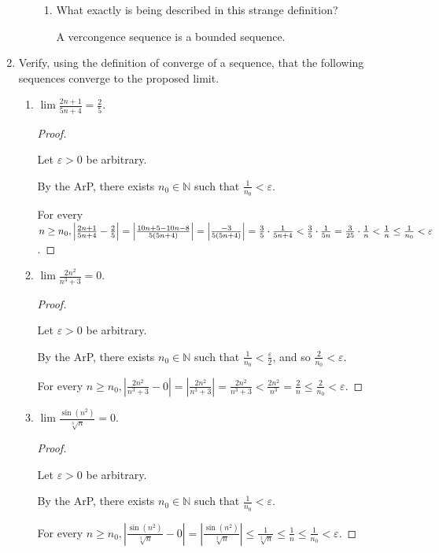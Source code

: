 \documentclass[12pt]{article}
\newcommand{\NN}{\mathbb{N}}
\newcommand\abs[1]{\left| #1 \right|} %
\newcommand{\eps}{\varepsilon}
\begin{document}
\begin{enumerate}
\begin{enumerate}
\begin{enumerate}
\item What exactly is being described in this strange definition?

A vercongence sequence is a bounded sequence.
\end{enumerate}
\end{enumerate}

\hrulefill

\item
Verify, using the definition of converge of a sequence, that the following sequences converge to the proposed limit.
\begin{enumerate}
\item $\lim \frac{2n + 1}{5n + 4} = \frac{2}{5}$.

\begin{proof}
$ $

Let $\eps > 0$ be arbitrary.

By the ArP, there exists $n_0 \in \NN$ such that $\frac{1}{n_0} < \eps$.

For every $n \ge n_0, \abs{\frac{2n + 1}{5n + 4} - \frac{2}{5}} = \abs{\frac{10n + 5 - 10n - 8}{5(5n + 4)}} = \abs{\frac{-3}{5(5n + 4)}} = \frac{3}{5} \cdot \frac{1}{5n + 4}
\\
< \frac{3}{5} \cdot \frac{1}{5n} = \frac{3}{25} \cdot \frac{1}{n} < \frac{1}{n} \le \frac{1}{n_0} < \eps$.
\end{proof}

\item $\lim \frac{2 n^2}{n^3 + 3} = 0$.

\begin{proof}
$ $

Let $\eps > 0$ be arbitrary.

By the ArP, there exists $n_0 \in \NN$ such that $\frac{1}{n_0} < \frac{\eps}{2}$, and so $\frac{2}{n_0} < \eps$.

For every $n \ge n_0, \abs{\frac{2 n^2}{n^3 + 3} - 0} = \abs{\frac{2 n^2}{n^3 + 3}} = \frac{2 n^2}{n^3 + 3} < \frac{2 n^2}{n^3} = \frac{2}{n} \le \frac{2}{n_0} < \eps$.
\end{proof}

\item $\lim \frac{\sin (n^2)}{\sqrt[3]{n}} = 0$.

\begin{proof}
$ $

Let $\eps > 0$ be arbitrary.

By the ArP, there exists $n_0 \in \NN$ such that $\frac{1}{n_0} < \eps$.

For every $n \ge n_0, \abs{\frac{\sin (n^2)}{\sqrt[3]{n}} - 0} = \abs{\frac{\sin (n^2)}{\sqrt[3]{n}}} \le \frac{1}{\sqrt[3]{n}} \le \frac{1}{n} \le \frac{1}{n_0} < \eps$.
\end{proof}
\end{enumerate}


\end{enumerate}
\end{document}

